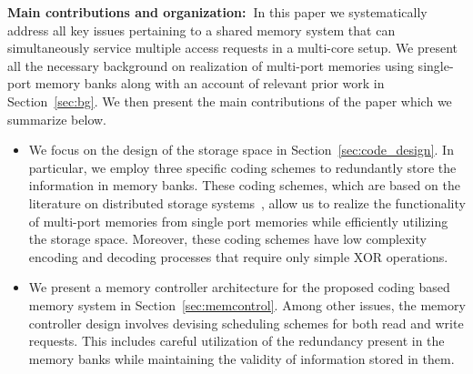 \noindent \textbf{Main contributions and organization:~}In this paper we systematically address all key issues pertaining to a shared memory system that can simultaneously service multiple access requests in a multi-core setup. We present all the necessary background on realization of multi-port memories using single-port memory banks along with an account of relevant prior work in Section~\ref{sec:bg}. We then present the main contributions of the paper which we summarize below. %
\begin{itemize}
\item We focus on the design of the storage space in Section~\ref{sec:code_design}. In particular, we employ three specific coding schemes to redundantly store the information in memory banks. These coding schemes, which are based on the literature on distributed storage systems~\cite{dimakis, Gopalan12, batchcodes, RPDV16}, allow us to realize the functionality of multi-port memories from single port memories while efficiently utilizing the storage space. Moreover, these coding schemes have low complexity encoding and decoding processes that require only simple XOR operations. %
\item We present a memory controller architecture for the proposed coding based memory system in Section~\ref{sec:memcontrol}. Among other issues, the memory controller design involves devising scheduling schemes for both read and write requests. This includes careful utilization of the redundancy present in the memory banks while maintaining the validity of information stored in them.

\end{itemize}
